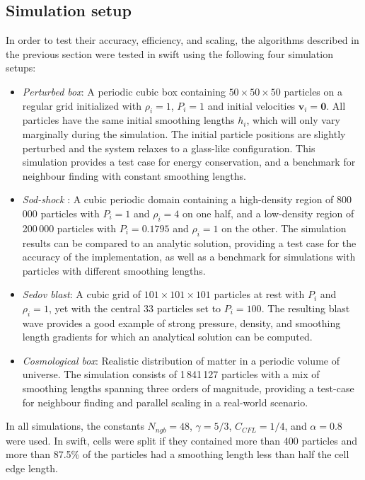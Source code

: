 \documentclass[final]{siamltex}
\newcommand{\swift}
    {{\sc swift}\xspace}
\begin{document}
\subsection{Simulation setup}

In order to test their accuracy, efficiency, and scaling,
the algorithms described in the previous section
were tested in \swift using the following four
simulation setups:
%
\begin{itemize}
    \item {\em Perturbed box}: A periodic cubic box containing
        $50\times 50\times 50$ particles on a regular grid
        initialized with $\rho_i=1$,
        $P_i=1$ and initial velocities $\mathbf v_i=\mathbf 0$.
        All particles have the same initial smoothing lengths $h_i$,
        which will only vary marginally during the simulation.
        The initial particle positions are slightly perturbed
        and the system relaxes to a glass-like configuration.
        This simulation provides a test case for energy
        conservation, and a benchmark for neighbour finding with
        constant smoothing lengths.
    \item {\em Sod-shock} \cite{ref:Sod1978}: A cubic periodic domain containing a
        high-density region of
        800\,000 particles with $P_i=1$ and $\rho_i=4$ on one half,
        and a low-density region of 200\,000
        particles with $P_i=0.1795$ and $\rho_i=1$ on the other.
        The simulation results can be compared to an analytic
        solution, providing a test case for the accuracy of the
        implementation, as well as a benchmark for simulations
        with particles with different smoothing lengths.
    \item {\em Sedov blast}: A cubic grid of $101\times 101\times 101$
        particles at rest with $P_i$ and $\rho_i=1$, yet with the
        central 33 particles set to
        $P_i=100$.
        The resulting blast wave provides a good example of
        strong pressure, density, and smoothing length gradients
        for which an analytical solution can be computed.
    \item {\em Cosmological box}: Realistic distribution of matter
        in a periodic volume of universe. The simulation consists
        of 1\,841\,127 particles with
        a mix of smoothing lengths spanning three orders of magnitude,
        providing a test-case for neighbour finding and parallel
        scaling in a real-world scenario.
\end{itemize}
%
In all simulations, the constants $N_{ngb}=48$, $\gamma=5/3$,
$C_{CFL}=1/4$, and $\alpha = 0.8$ were used.
In \swift, cells were split if they contained more than 400
particles and more than 87.5\% of the particles had a smoothing
length less than half the cell edge length.
\end{document}
